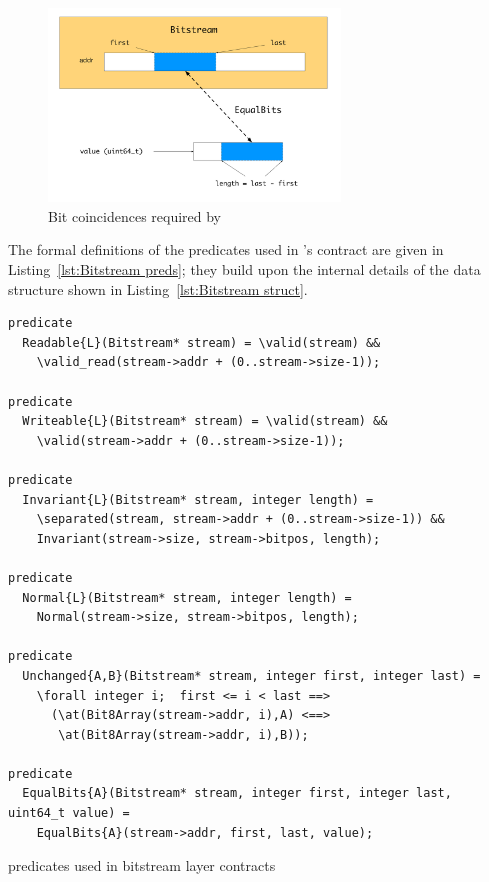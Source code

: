 \begin{figure}[hbt]
\begin{center}
\includegraphics[width=0.69\textwidth]{figures/equalbits.pdf}
\caption{\label{fig:EqualBits correspondance}
	Bit coincidences required by }
\end{center}
\end{figure}

\FloatBarrier

The formal definitions of the \acsl predicates used
in 's contract are given in
Listing~\ref{lst:Bitstream preds}; they build upon the internal
details of the  data structure shown in
Listing~\ref{lst:Bitstream struct}.

\begin{listing}[hbt]
\begin{minipage}{0.99\textwidth}
\begin{lstlisting}[style=acsl-block]
predicate 
  Readable{L}(Bitstream* stream) = \valid(stream) &&
    \valid_read(stream->addr + (0..stream->size-1));

predicate
  Writeable{L}(Bitstream* stream) = \valid(stream) &&
    \valid(stream->addr + (0..stream->size-1));

predicate
  Invariant{L}(Bitstream* stream, integer length) =
    \separated(stream, stream->addr + (0..stream->size-1)) &&
    Invariant(stream->size, stream->bitpos, length);

predicate
  Normal{L}(Bitstream* stream, integer length) =
    Normal(stream->size, stream->bitpos, length);

predicate
  Unchanged{A,B}(Bitstream* stream, integer first, integer last) =
    \forall integer i;  first <= i < last ==>
      (\at(Bit8Array(stream->addr, i),A) <==>
       \at(Bit8Array(stream->addr, i),B));

predicate
  EqualBits{A}(Bitstream* stream, integer first, integer last, uint64_t value) =
    EqualBits{A}(stream->addr, first, last, value);
\end{lstlisting}
\end{minipage}
\caption{\label{lst:Bitstream preds}
	\acsl predicates used in bitstream layer contracts}
\end{listing}

